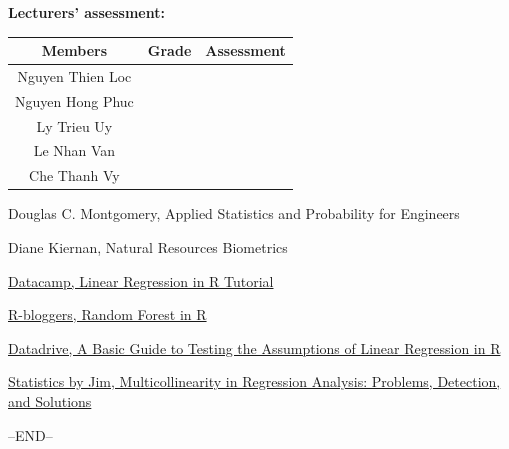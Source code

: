 \documentclass[a4paper,12pt]{article}
\begin{document}
\textbf{Lecturers' assessment:}
\begin{longtable}{|c|p{5 em}|c|}
    \hline
    Members & \centering Grade & Assessment \\
    \hline
    Nguyen Thien Loc     &&   \\
    \hline
    Nguyen Hong Phuc     & &\\
    \hline
    Ly Trieu Uy  && \\
    \hline
    Le Nhan Van & & \\ 
    \hline
    Che Thanh Vy & & \\
    \hline
    
\end{longtable}
\newpage
\pagestyle{fancy}
\tableofcontents
\vspace*{0.25 cm}








\newpage

\begin{enumerate}[{[1]}]

    \item Douglas C. Montgomery, Applied Statistics and Probability for Engineers
    \item Diane Kiernan, Natural Resources Biometrics
    \item \href{https://www.datacamp.com/tutorial/linear-regression-R?fbclid=IwZXh0bgNhZW0CMTAAAR2rM1Nk78oA2HyQ8HTfU6cdiT5EDVTDD754uUernmQtS4xvOesVLav6Tuo_aem_AYgNihmoF16jmpNznycZf9GcR6YiCY5vDKZSCDlcCY-0rGH4CSdQ8ySsrXzBkGCcXGaVxwPHTxx3DrkHygbUZfn2}{Datacamp, Linear Regression in R Tutorial}
    \item \href{https://www.r-bloggers.com/2021/04/random-forest-in-r/?fbclid=IwZXh0bgNhZW0CMTAAAR0SgzBABMzhICDuovVeSGvuoMyapky28GsJxdwXjbe0DrwliqBCYvaBsxI_aem_AYgmjl7qPmInPhnCBnikDUa3tMNXbZcWbo0VjxhdQ7-tL5OytsaEkuXhw25GFnoXqstq-Tna2eMV2vASqpbdWgVV}{R-bloggers, Random Forest in R}
    \item \href{https://godatadrive.com/blog/basic-guide-to-test-assumptions-of-linear-regression-in-r?fbclid=IwZXh0bgNhZW0CMTAAAR28-KwzGrlC4-xa-z2NWsLYIWjr-oKTO7KUHaphn3k4ErIvTxSUs_PDENs_aem_AYjy1XX2JvwS3wLNsgsqBoAcKMQagbLfxHsB2sIm0P1pfg3e7A-_pvEaSzLxX1y1J-2a5FGi98dwLUYsTBvQgllz}{Datadrive, A Basic Guide to Testing the Assumptions of Linear Regression in R }
    \item \href{https://statisticsbyjim.com/regression/multicollinearity-in-regression-analysis/?fbclid=IwZXh0bgNhZW0CMTAAAR23Tx2xJS6mh7-M1LI5CVTlatsc1UNnBLYc7Z7-cOHTTJ_Z_vw1XOblRpY_aem_AYhh_OyebBF1dKCDlHk2LPZqbq413mxpnXpQoYQ4o_KWWR8m8OKyXfM8CRoBQEiJKjg1ywtSieGlHNfKte-s5_fS}{Statistics by Jim, Multicollinearity in Regression Analysis: Problems, Detection, and Solutions }
\end{enumerate}
\centering --END--
\end{document}
